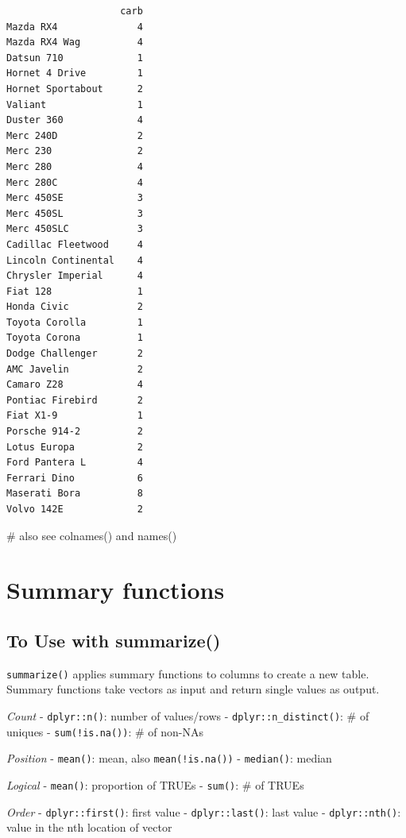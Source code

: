 \documentclass[
  letterpaper,
  DIV=11,
  numbers=noendperiod]{scrreprt}
\newenvironment{Shaded}{\begin{snugshade}}{\end{snugshade}}
\newcommand{\CommentTok}[1]{\textcolor[rgb]{0.37,0.37,0.37}{#1}}
\begin{document}
\begin{verbatim}
                    carb
Mazda RX4              4
Mazda RX4 Wag          4
Datsun 710             1
Hornet 4 Drive         1
Hornet Sportabout      2
Valiant                1
Duster 360             4
Merc 240D              2
Merc 230               2
Merc 280               4
Merc 280C              4
Merc 450SE             3
Merc 450SL             3
Merc 450SLC            3
Cadillac Fleetwood     4
Lincoln Continental    4
Chrysler Imperial      4
Fiat 128               1
Honda Civic            2
Toyota Corolla         1
Toyota Corona          1
Dodge Challenger       2
AMC Javelin            2
Camaro Z28             4
Pontiac Firebird       2
Fiat X1-9              1
Porsche 914-2          2
Lotus Europa           2
Ford Pantera L         4
Ferrari Dino           6
Maserati Bora          8
Volvo 142E             2
\end{verbatim}

\begin{Shaded}
\begin{Highlighting}[]
\CommentTok{\# also see colnames() and names()}
\end{Highlighting}
\end{Shaded}

\hypertarget{summary-functions}{%
\chapter{Summary functions}\label{summary-functions}}

\hypertarget{to-use-with-summarize}{%
\section{To Use with summarize()}\label{to-use-with-summarize}}

\texttt{summarize()} applies summary functions to columns to create a
new table. Summary functions take vectors as input and return single
values as output.

\emph{Count} - \texttt{dplyr::n()}: number of values/rows -
\texttt{dplyr::n\_distinct()}: \# of uniques - \texttt{sum(!is.na())}:
\# of non-NAs

\emph{Position} - \texttt{mean()}: mean, also \texttt{mean(!is.na())} -
\texttt{median()}: median

\emph{Logical} - \texttt{mean()}: proportion of TRUEs - \texttt{sum()}:
\# of TRUEs

\emph{Order} - \texttt{dplyr::first()}: first value -
\texttt{dplyr::last()}: last value - \texttt{dplyr::nth()}: value in the
nth location of vector
\end{document}
